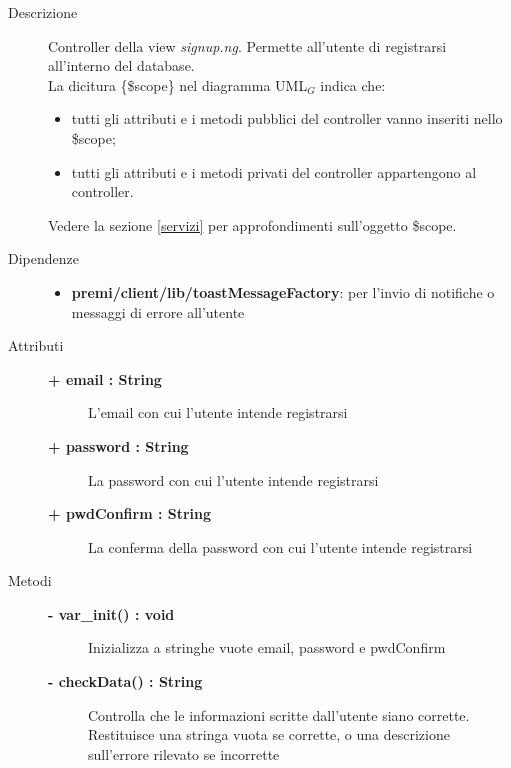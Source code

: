 \begin{description}
\item[Descrizione] \hfill
	Controller della view \textit{signup.ng}. Permette all'utente di registrarsi all'interno del database.
	\\ La dicitura \{\$scope\} nel diagramma UML$_G$ indica che:
\begin{itemize}
\item tutti gli attributi e i metodi pubblici del controller vanno inseriti nello \$scope;
\item tutti gli attributi e i metodi privati del controller appartengono al controller.
\end{itemize}
Vedere la sezione \ref{servizi} per approfondimenti sull'oggetto \$scope.
	
	
	
\item[Dipendenze] \hfill
	\begin{itemize}
		\item \textbf{premi/client/lib/toastMessageFactory}: per l'invio di notifiche o messaggi di errore all'utente
	\end{itemize}
	
	
\item[Attributi] \hfill
	\begin{description}
		\item[\textbf{+ email : String			}] \hfill
			L'email con cui l'utente intende registrarsi
		\item[\textbf{+ password : String			}] \hfill
			La password con cui l'utente intende registrarsi
		\item[\textbf{+ pwdConfirm : String			}] \hfill
			La conferma della password con cui l'utente intende registrarsi
	\end{description}
	
	
\item[Metodi] \hfill

	\begin{description}
		\item[\textbf{\color{blue}- var\_init() : void			}] \hfill
			Inizializza a stringhe vuote email, password e pwdConfirm
	\end{description}
	
	\begin{description}
		\item[\textbf{\color{blue}- checkData() : String			}] \hfill
			Controlla che le informazioni scritte dall'utente siano corrette. Restituisce una stringa vuota se corrette, o una descrizione sull'errore rilevato se incorrette
	\end{description}
	

\end{description}
